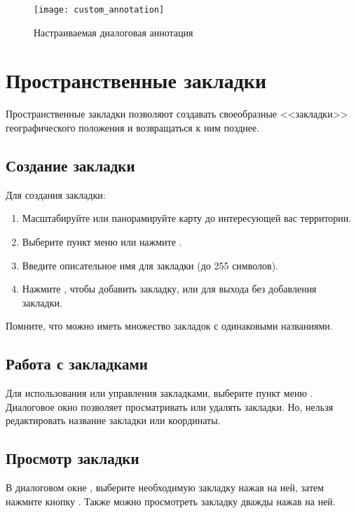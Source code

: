 \begin{figure}[ht]
   \centering
   \texttt{[image: custom\_annotation]}
   \caption{Настраиваемая диалоговая аннотация \nixcaption}
   \label{fig:custom-annotations}
\end{figure}

\newpage

\section{Пространственные закладки}\label{sec:bookmarks}

Пространственные закладки позволяют создавать своеобразные <<закладки>>
географического положения и возвращаться к ним позднее.

\subsection{Создание закладки}
Для создания закладки:
\begin{enumerate}
\item Масштабируйте или панорамируйте карту до интересующей вас территории.
\item Выберите пункт меню  \arrow
{} или нажмите .
\item Введите описательное имя для закладки (до 255 символов).
\item Нажмите , чтобы добавить закладку, или 
для выхода без добавления закладки.
\end{enumerate}

Помните, что можно иметь множество закладок с одинаковыми названиями.

\subsection{Работа с закладками}
Для использования или управления закладками, выберите пункт меню
 \arrow {}. Диалоговое
окно  позволяет просматривать или удалять
закладки. Но, нельзя редактировать название закладки или координаты.

\subsection{Просмотр закладки}
В диалоговом окне , выберите необходимую
закладку нажав на ней, затем нажмите кнопку . Также
можно просмотреть закладку дважды нажав на ней.

